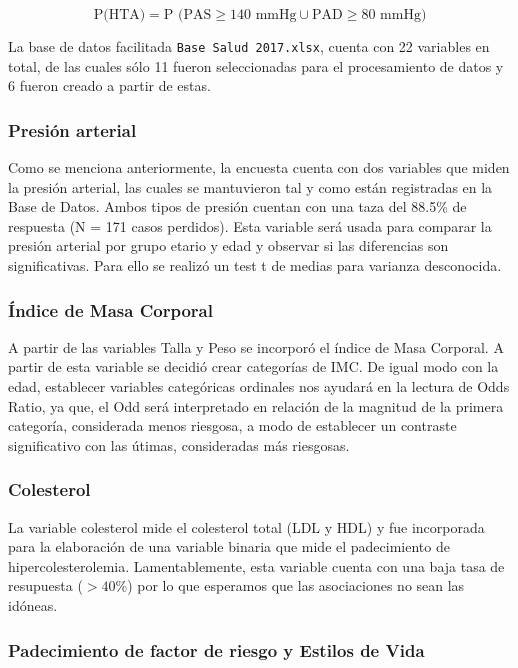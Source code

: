 \documentclass{aa}
\begin{document}
$$ \textrm{P(HTA)} =  \textrm{P (PAS} \geq 140 \textrm{ mmHg} \cup \textrm{PAD} \geq 80 \textrm{ mmHg)}$$

La base de datos facilitada \texttt{Base Salud 2017.xlsx}, cuenta con 22 variables en total, de las cuales sólo 11 fueron seleccionadas para el procesamiento de datos y 6 fueron creado a partir de estas.

\subsubsection{Presión arterial}

Como se menciona anteriormente, la encuesta cuenta con dos variables que miden la presión arterial, las cuales se mantuvieron tal y como están registradas en la Base de Datos. Ambos tipos de presión cuentan con una taza del 88.5\%  de respuesta (N = 171 casos perdidos). Esta variable será usada para comparar la presión arterial por grupo etario y edad y observar si las diferencias son significativas. Para ello se realizó un test t de medias para varianza desconocida.

\subsubsection{Índice de Masa Corporal}

A partir de las variables Talla y Peso se incorporó el índice de Masa Corporal. A partir de esta variable se decidió crear categorías de IMC. De igual modo con la edad, establecer variables categóricas ordinales nos ayudará en la lectura de Odds Ratio, ya que, el Odd será interpretado en relación de la magnitud de la primera categoría, considerada menos riesgosa, a modo de establecer un contraste significativo con las útimas, consideradas más riesgosas.

\subsubsection{Colesterol}

La variable colesterol mide el colesterol total (LDL y HDL) y fue incorporada para la elaboración de una variable binaria que mide el padecimiento de hipercolesterolemia. Lamentablemente, esta variable cuenta con una baja tasa de resupuesta ($> 40\%$) por lo que esperamos que las asociaciones no sean las idóneas.

\subsubsection{Padecimiento de factor de riesgo y Estilos de Vida}
\end{document}
